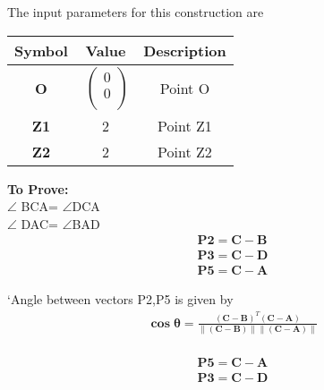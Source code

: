 \documentclass[10pt, a4paper]{article}
\providecommand{\norm}[1]{\left\lVert#1\right\rVert}
\let\vec\mathbf
\begin{document}
The input parameters for this construction are 
\begin{center}
\begin{tabular}{|c|c|c|}
	\hline
	\textbf{Symbol}&\textbf{Value}&\textbf{Description}\\
	\hline
	\textbf{O}&$\
	\begin{pmatrix}
		0 \\
		0 \\
	\end{pmatrix}$%
	&Point O\\
	\hline
	\textbf{Z1}&2
	&Point Z1\\
	\hline                         
	\textbf{Z2}&2
        &Point Z2\\
	
	\hline
\end{tabular}
\end{center}
\vspace{.25 cm}
\textbf{To Prove:}\\ 
$\angle$ BCA= $\angle$DCA \\ 
$\angle$ DAC= $\angle$BAD \\
\begin{align}
 \vec{P2} = \vec{C} - \vec{B}\\
 \vec{P3} = \vec{C} - \vec{D}\\
 \vec{P5} = \vec{C} - \vec{A}
	\end{align}
		
`Angle between vectors P2,P5 is given by \\
\begin{align}
\vec{\cos \theta} =\frac{\vec{(C-B)}^T  \vec{(C-A)}}{\norm{\vec{(C-B)}}\norm{\vec{(C-A)}}}
\end{align}
\vspace{3mm}\\
\begin{align}
 \vec{P5} = \vec{C} - \vec{A}\\
 \vec{P3} = \vec{C} - \vec{D}
	\end{align}
  
\end{document}
